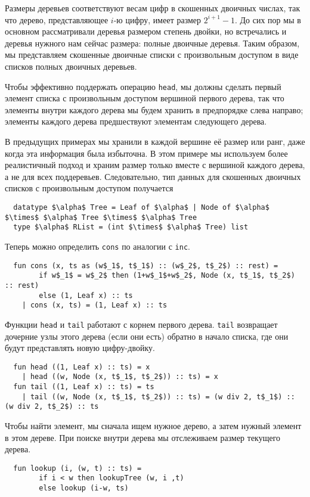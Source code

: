 \begin{frame}[fragile]{}
Размеры деревьев соответствуют весам цифр в скошенных двоичных числах,
так что дерево, представляющее $i$-ю цифру, имеет размер $2^{i+1} -
1$. До сих пор мы в основном рассматривали деревья размером степень
двойки, но встречались и деревья нужного нам сейчас размера: полные
двоичные деревья. Таким образом, мы представляем скошенные двоичные
списки с произвольным доступом в виде списков полных двоичных
деревьев.

Чтобы эффективно поддержать операцию \lstinline!head!, мы должны
сделать первый элемент списка с произвольным доступом вершиной первого
дерева, так что элементы внутри каждого дерева мы будем хранить в
предпорядке слева направо; элементы каждого дерева предшествуют
элементам следующего дерева.

В предыдущих примерах мы хранили в каждой вершине её размер или ранг,
даже когда эта информация была избыточна. В этом примере мы используем
более реалистичный подход и храним размер только вместе с вершиной
каждого дерева, а не для всех поддеревьев. Следовательно, тип данных
для скошенных двоичных списков с произвольным доступом получается
\begin{lstlisting}
  datatype $\alpha$ Tree = Leaf of $\alpha$ | Node of $\alpha$ $\times$ $\alpha$ Tree $\times$ $\alpha$ Tree
  type $\alpha$ RList = (int $\times$ $\alpha$ Tree) list
\end{lstlisting}
Теперь можно определить \lstinline!cons! по аналогии с
\lstinline!inc!.
\begin{lstlisting}
  fun cons (x, ts as (w$_1$, t$_1$) :: (w$_2$, t$_2$) :: rest) =
        if w$_1$ = w$_2$ then (1+w$_1$+w$_2$, Node (x, t$_1$, t$_2$) :: rest)
        else (1, Leaf x) :: ts
    | cons (x, ts) = (1, Leaf x) :: ts
\end{lstlisting}
Функции \lstinline!head! и \lstinline!tail! работают с корнем первого
дерева. \lstinline!tail! возвращает дочерние узлы этого дерева (если
они есть) обратно в начало списка, где они будут представлять новую
цифру-двойку.
\begin{lstlisting}
  fun head ((1, Leaf x) :: ts) = x
    | head ((w, Node (x, t$_1$, t$_2$)) :: ts) = x
  fun tail ((1, Leaf x) :: ts) = ts
    | tail ((w, Node (x, t$_1$, t$_2$)) :: ts) = (w div 2, t$_1$) :: (w div 2, t$_2$) :: ts
\end{lstlisting}
Чтобы найти элемент, мы сначала ищем нужное дерево, а затем нужный
элемент в этом дереве. При поиске внутри дерева мы отслеживаем размер
текущего дерева.
\begin{lstlisting}
  fun lookup (i, (w, t) :: ts) =
        if i < w then lookupTree (w, i ,t)
        else lookup (i-w, ts)


\end{lstlisting}
\end{frame}
